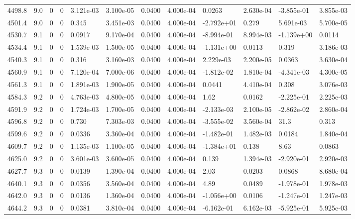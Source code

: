 \documentclass[preview]{standalone}
\begin{document}
{{{{{{{{{{{\begin{tabular}{L{1.2cm}C{1.2cm} C{0.3cm}C{0.5cm} C{1.4cm}C{1.4cm} C{1.4cm}C{1.4cm} C{1.6cm}C{1.6cm} C{1.6cm}C{1.6cm}}
  4498.8  &   9.0  & 0     &  0 &  3.121e-03  & 3.100e-05  &  0.0400&   4.000e-04& 0.0263 & 2.630e-04   &  -3.855e-01 & 3.855e-03  \\ 
  4501.4  &   9.0  & 0     &  0 &  0.345  & 3.451e-03  &  0.0400&   4.000e-04& -2.792e+01 & 0.279   &  5.691e-03 & 5.700e-05  \\ 
  4530.7  &   9.1  & 0     &  0 &  0.0917  & 9.170e-04  &  0.0400&   4.000e-04& -8.994e-01 & 8.994e-03   &  -1.139e+00 & 0.0114  \\ 
  4534.4  &   9.1  & 0     &  0 &  1.539e-03  & 1.500e-05  &  0.0400&   4.000e-04& -1.131e+00 & 0.0113   &  0.319 & 3.186e-03  \\ 
  4540.3  &   9.1  & 0     &  0 &  0.316  & 3.160e-03  &  0.0400&   4.000e-04& 2.229e-03 & 2.200e-05   &  0.0363 & 3.630e-04  \\ 
  4560.9  &   9.1  & 0     &  0 &  7.120e-04  & 7.000e-06  &  0.0400&   4.000e-04& -1.812e-02 & 1.810e-04   &  -4.341e-03 & 4.300e-05  \\ 
  4561.3  &   9.1  & 0     &  0 &  1.891e-03  & 1.900e-05  &  0.0400&   4.000e-04& 0.0441 & 4.410e-04   &  0.308 & 3.076e-03  \\ 
  4584.3  &   9.2  & 0     &  0 &  4.763e-03  & 4.800e-05  &  0.0400&   4.000e-04& 1.62 & 0.0162   &  -2.225e-01 & 2.225e-03  \\ 
  4591.9  &   9.2  & 0     &  0 &  1.724e-03  & 1.700e-05  &  0.0400&   4.000e-04& -2.133e-03 & 2.100e-05   &  -2.862e-02 & 2.860e-04  \\ 
  4596.8  &   9.2  & 0     &  0 &  0.730  & 7.303e-03  &  0.0400&   4.000e-04& -3.555e-02 & 3.560e-04   &  31.3 & 0.313  \\ 
  4599.6  &   9.2  & 0     &  0 &  0.0336  & 3.360e-04  &  0.0400&   4.000e-04& -1.482e-01 & 1.482e-03   &  0.0184 & 1.840e-04  \\ 
  4609.7  &   9.2  & 0     &  0 &  1.135e-03  & 1.100e-05  &  0.0400&   4.000e-04& -1.384e+01 & 0.138   &  8.63 & 0.0863  \\ 
  4625.0  &   9.2  & 0     &  0 &  3.601e-03  & 3.600e-05  &  0.0400&   4.000e-04& 0.139 & 1.394e-03   &  -2.920e-01 & 2.920e-03  \\ 
  4627.7  &   9.3  & 0     &  0 &  0.0139  & 1.390e-04  &  0.0400&   4.000e-04& 2.03 & 0.0203   &  0.0868 & 8.680e-04  \\ 
  4640.1  &   9.3  & 0     &  0 &  0.0356  & 3.560e-04  &  0.0400&   4.000e-04& 4.89 & 0.0489   &  -1.978e-01 & 1.978e-03  \\ 
  4642.0  &   9.3  & 0     &  0 &  0.0136  & 1.360e-04  &  0.0400&   4.000e-04& -1.056e+00 & 0.0106   &  -1.247e-01 & 1.247e-03  \\ 
  4644.2  &   9.3  & 0     &  0 &  0.0381  & 3.810e-04  &  0.0400&   4.000e-04& -6.162e-01 & 6.162e-03   &  -5.925e-01 & 5.925e-03  \\ 
\hline 
\end{tabular} 

}}}}}}}}}}}
\end{document}
